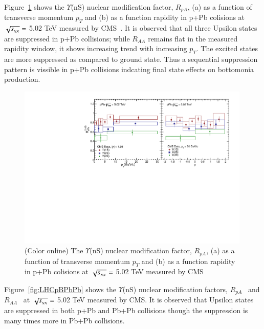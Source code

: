 Figure~\ref{fig:LHCpPb5} shows the $\Upsilon$(nS) nuclear modification factor, $R_{pA}$,
      (a) as a function of transverse momentum $p_{T}$
    and (b) as a function rapidity in p+Pb colisions at $\sqrt{s_{_{NN}}} =$ 5.02 TeV measured by CMS~\cite{CMS:2022wfi}.
    It is observed that all three Upsilon states are suppressed in p+Pb collisions; while
    $R_{AA}$ remains flat in the measured rapidity window, it shows increasing trend with
    increasing $p_T$. The excited states are more suppressed as compared to ground state.
    Thus a sequential suppression pattern is vissible in p+Pb collisions indcating final
    state effects on bottomonia production. 

\begin{figure}
  \includegraphics[width=0.99\textwidth]{Figures/Fig12_LHC_YnSRPPbPtRap.pdf}
     \caption{(Color online) The $\Upsilon$(nS) nuclear modification factor, $R_{pA}$,
      (a) as a function of transverse momentum $p_{T}$
    and (b) as a function rapidity in p+Pb colisions at $\sqrt{s_{_{NN}}} =$ 5.02 TeV measured by CMS~\cite{CMS:2022wfi}
  }
  \label{fig:LHCpPb5}
\end{figure}




Figure~\ref{fig:LHCpBPbPb} shows the $\Upsilon$(nS) nuclear modification factors,
    $R_{pA}$~\cite{CMS:2022wfi} and $R_{AA}$~\cite{CMS:2018zza}
 at $\sqrt{s_{_{NN}}} =$ 5.02 TeV measured by CMS.
 It is observed that Upsilon states are suppressed in both p+Pb and Pb+Pb collisions
 though the suppression is many times more in Pb+Pb collisions. 
    

